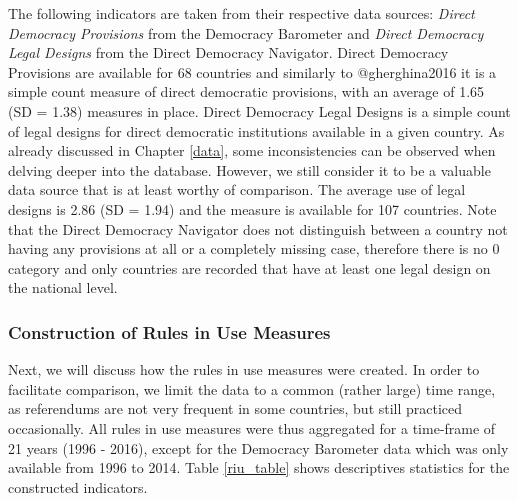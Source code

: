 \documentclass[]{article}
\begin{document}
The following indicators are taken from their respective data sources:
\emph{Direct Democracy Provisions} from the Democracy Barometer and
\emph{Direct Democracy Legal Designs} from the Direct Democracy
Navigator. Direct Democracy Provisions are available for 68 countries
and similarly to @gherghina2016 it is a simple count measure of direct
democratic provisions, with an average of 1.65 (SD = 1.38) measures in
place. Direct Democracy Legal Designs is a simple count of legal designs
for direct democratic institutions available in a given country. As
already discussed in Chapter \ref{data}, some inconsistencies can be
observed when delving deeper into the database. However, we still
consider it to be a valuable data source that is at least worthy of
comparison. The average use of legal designs is 2.86 (SD = 1.94) and the
measure is available for 107 countries. Note that the Direct Democracy
Navigator does not distinguish between a country not having any
provisions at all or a completely missing case, therefore there is no 0
category and only countries are recorded that have at least one legal
design on the national level.

\subsubsection{Construction of Rules in Use
Measures}\label{construction-of-rules-in-use-measures}

Next, we will discuss how the rules in use measures were created. In
order to facilitate comparison, we limit the data to a common (rather
large) time range, as referendums are not very frequent in some
countries, but still practiced occasionally. All rules in use measures
were thus aggregated for a time-frame of 21 years (1996 - 2016), except
for the Democracy Barometer data which was only available from 1996 to
2014. Table \ref{riu_table} shows descriptives statistics for the
constructed indicators.
\end{document}
